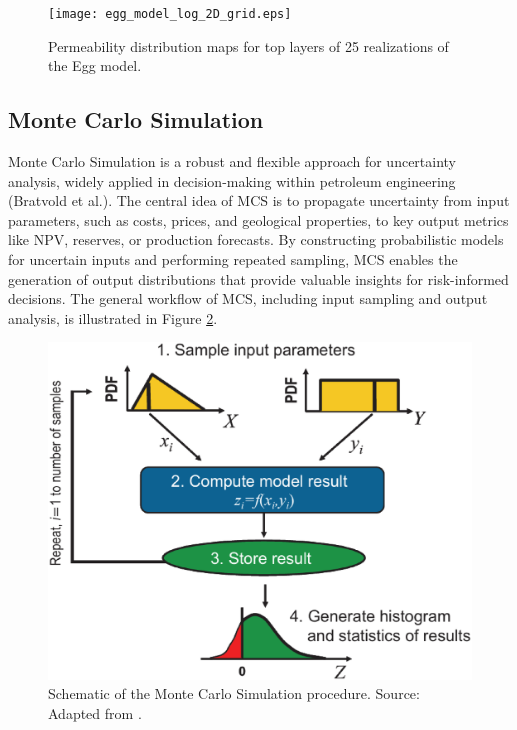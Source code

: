 \documentclass[pdflatex,sn-basic]{sn-jnl}%
\theoremstyle{thmstyleone}%
\theoremstyle{thmstyletwo}%
\theoremstyle{thmstylethree}%
\begin{document}
\begin{figure}[H]
\centering
\begin{minipage}{0.95\textwidth}
  \texttt{[image: egg\_model\_log\_2D\_grid.eps]}
  \caption{Permeability distribution maps for top layers of 25 realizations of the Egg model.}
  \label{fig5}
\end{minipage}
\end{figure}

\subsection{Monte Carlo Simulation}\label{subsec42}

Monte Carlo Simulation is a robust and flexible approach for uncertainty analysis, widely applied in decision-making within petroleum engineering (Bratvold et al.). The central idea of MCS is to propagate uncertainty from input parameters, such as costs, prices, and geological properties, to key output metrics like NPV, reserves, or production forecasts. By constructing probabilistic models for uncertain inputs and performing repeated sampling, MCS enables the generation of output distributions that provide valuable insights for risk-informed decisions. The general workflow of MCS, including input sampling and output analysis, is illustrated in Figure \ref{fig6}.

\begin{figure}[H]
\centering
\begin{minipage}{0.85\textwidth}
  \includegraphics[width=\textwidth]{schematic_MCS.eps}
  \caption{Schematic of the Monte Carlo Simulation procedure. Source: Adapted from \cite{ref24}.}
  \label{fig6}
\end{minipage}
\end{figure}
\end{document}
